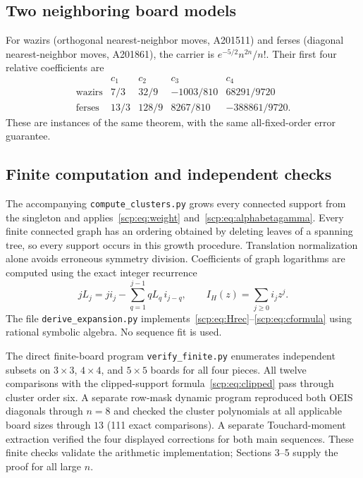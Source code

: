 \documentclass[11pt]{article}
\begin{document}
\subsection{Two neighboring board models}
For wazirs (orthogonal nearest-neighbor moves, A201511) and ferses (diagonal nearest-neighbor moves, A201861), the carrier is $e^{-5/2}n^{2n}/n!$. Their first four relative coefficients are
\[
\begin{array}{c|rrrr}
&c_1&c_2&c_3&c_4\\\hline
\text{wazirs}&7/3&32/9&-1003/810&68291/9720\\
\text{ferses}&13/3&128/9&8267/810&-388861/9720.
\end{array}
\]
These are instances of the same theorem, with the same all-fixed-order error guarantee.

\subsection{Finite computation and independent checks}
The accompanying \texttt{compute\_clusters.py} grows every connected support from the singleton and applies~\eqref{scp:eq:weight} and~\eqref{scp:eq:alphabetagamma}. Every finite connected graph has an ordering obtained by deleting leaves of a spanning tree, so every support occurs in this growth procedure. Translation normalization alone avoids erroneous symmetry division. Coefficients of graph logarithms are computed using the exact integer recurrence
\[
 jL_j=j i_j-\sum_{q=1}^{j-1}qL_q\,i_{j-q},
 \qquad I_H(z)=\sum_{j\ge0}i_jz^j.
\]
The file \texttt{derive\_expansion.py} implements~\eqref{scp:eq:Hrec}--\eqref{scp:eq:cformula} using rational symbolic algebra. No sequence fit is used.

The direct finite-board program \texttt{verify\_finite.py} enumerates independent subsets on $3\times3$, $4\times4$, and $5\times5$ boards for all four pieces. All twelve comparisons with the clipped-support formula~\eqref{scp:eq:clipped} pass through cluster order six. A separate row-mask dynamic program reproduced both OEIS diagonals through $n=8$ and checked the cluster polynomials at all applicable board sizes through $13$ (111 exact comparisons). A separate Touchard-moment extraction verified the four displayed corrections for both main sequences. These finite checks validate the arithmetic implementation; Sections 3--5 supply the proof for all large $n$.
\end{document}
